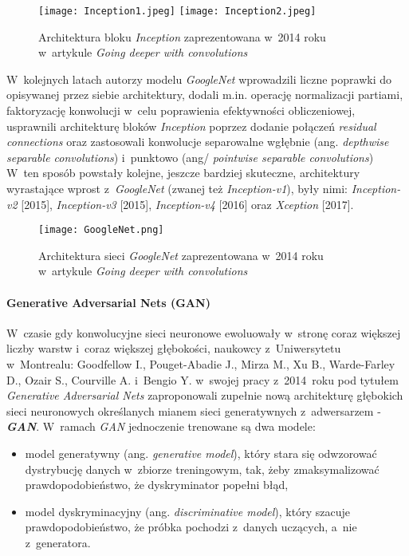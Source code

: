 \begin{figure}[!h]
    \centering \texttt{[image: Inception1.jpeg]}
    \centering \texttt{[image: Inception2.jpeg]}
    \captionsetup{format=hang}
    \caption{Architektura bloku \emph{Inception} zaprezentowana w~2014 roku w~artykule \emph{Going deeper with convolutions} \cite{szegedy}}
    \label{fig:inception1}
\end{figure}

 W~kolejnych latach autorzy modelu \emph{GoogleNet} wprowadzili liczne poprawki do opisywanej przez siebie architektury, dodali m.in. operację normalizacji partiami, faktoryzację konwolucji w~celu poprawienia efektywności obliczeniowej, usprawnili architekturę bloków \emph{Inception} poprzez dodanie połączeń \emph{residual connections} oraz zastosowali konwolucje separowalne wgłębnie (ang. \emph{depthwise separable convolutions}) i~punktowo (ang/ \emph{pointwise separable convolutions}) W~ten sposób powstały kolejne, jeszcze bardziej skuteczne, architektury wyrastające wprost z~\emph{GoogleNet} (zwanej też \emph{Inception-v1}), były nimi: \emph{Inception-v2} [2015], \emph{Inception-v3} [2015], \emph{Inception-v4} [2016] oraz \emph{Xception} [2017].

\newpage
\begin{figure}[!h]
    \centering \texttt{[image: GoogleNet.png]}
    \captionsetup{format=hang}
    \caption{Architektura sieci \emph{GoogleNet} zaprezentowana w~2014 roku w~artykule \emph{Going deeper with convolutions} \cite{szegedy}}
    \label{fig:googlenet1}
\end{figure}
\newpage

\paragraph*{Generative Adversarial Nets (GAN)}

W~czasie gdy konwolucyjne sieci neuronowe ewoluowały w~stronę coraz większej liczby warstw i~coraz większej głębokości, naukowcy z~Uniwersytetu w~Montrealu: Goodfellow I., Pouget-Abadie J., Mirza M., Xu B., Warde-Farley D.,
Ozair S., Courville A. i~Bengio Y. w~swojej pracy z~2014~roku pod tytułem \emph{Generative Adversarial Nets} \cite{goodfellow} zaproponowali zupełnie nową architekturę głębokich sieci neuronowych określanych mianem sieci generatywnych z~adwersarzem - \textbf{\emph{GAN}}. W~ramach \emph{GAN} jednoczenie trenowane są dwa modele: 

\begin{itemize}
\item model generatywny (ang. \emph{generative model}), który stara się odwzorować dystrybucję danych w~zbiorze treningowym, tak, żeby zmaksymalizować prawdopodobieństwo, że dyskryminator popełni błąd,
\item model dyskryminacyjny (ang. \emph{discriminative model}), który szacuje prawdopodobieństwo, że próbka pochodzi z~danych uczących, a~nie z~generatora.
\end{itemize}

